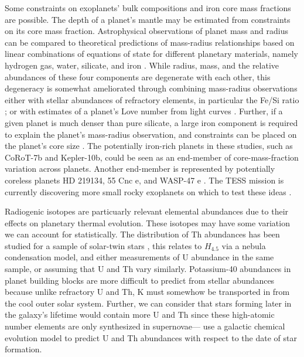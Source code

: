 Some constraints on exoplanets' bulk compositions and iron core mass fractions are possible. The depth of a planet's mantle may be estimated from constraints on its core mass fraction. Astrophysical observations of planet mass and radius can be compared to theoretical predictions of mass-radius relationships based on linear combinations of equations of state for different planetary materials, namely hydrogen gas, water, silicate, and iron \citep{Seager2007, Valencia2007, Rogers2010, Dorn2018}. While radius, mass, and the relative abundances of these four components are degenerate with each other, this degeneracy is somewhat ameliorated through combining mass-radius observations either with stellar abundances of refractory elements, in particular the Fe/Si ratio \citep{Dorn2017a, Brugger2017}; or with estimates of a planet's Love number from light curves \citep{Kellermann2018}. Further, if a given planet is much denser than pure silicate, a large iron component is required to explain the planet's mass-radius observation, and constraints can be placed on the planet's core size \citep{Wagner2012, Suissa2018}. The potentially iron-rich planets in these studies, such as CoRoT-7b and Kepler-10b, could be seen as an end-member of core-mass-fraction variation across planets. Another end-member is represented by potentially coreless planets HD 219134, 55 Cnc e, and WASP-47 e \citep{Dorn2019}. The TESS mission is currently discovering more small rocky exoplanets on which to test these ideas \citep[see][]{Jontof-Hutter2019}.

Radiogenic isotopes are particuarly relevant elemental abundances due to their effects on planetary thermal evolution. These isotopes may have some variation we can account for statistically. The distribution of Th abundances has been studied for a sample of solar-twin stars \citep[it varies two-fold;][]{Unterborn2015}, this relates to $H_{4.5}$ via a nebula condensation model, and either measurements of U abundance in the same sample, or assuming that U and Th vary similarly. Potassium-40 abundances in planet building blocks are more difficult to predict from stellar abundances because unlike refractory U and Th, K must somewhow be transported in from the cool outer solar system. Further, we can consider that stars forming later in the galaxy's lifetime would contain more U and Th since these high-atomic number elements are only synthesized in supernovae---\citet{Frank2014} use a galactic chemical evolution model to predict U and Th abundances with respect to the date of star formation. 


